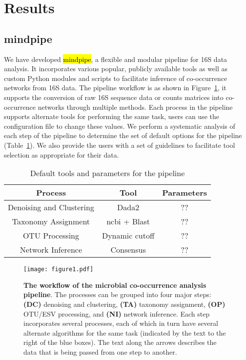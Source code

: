 
\section*{Results}

  \subsection*{mindpipe}

  We have developed \hl{mindpipe}, a flexible and modular pipeline for 16S data analysis.
  It incorporates various popular, publicly available tools as well as custom Python modules and scripts to facilitate inference of co-occurrence networks from 16S data.
  The pipeline workflow is as shown in Figure~\ref{fig:figure1}, it supports the conversion of raw 16S sequence data or counts matrices into co-occurrence networks through multiple methods.
  Each process in the pipeline supports alternate tools for performing the same task, users can use the configuration file to change these values.
  We perform a systematic analysis of each step of the pipeline to determine the set of default options for the pipeline (Table~\ref{tab:default_options}).
  We also provide the users with a set of guidelines to facilitate tool selection as appropriate for their data.

  \begin{table}[h]
    \centering
    \small
    \begin{tabular}{|c|c|c|}
      \hline
      \textbf{Process} & \textbf{Tool} & \textbf{Parameters} \\
      \hline
      Denoising and Clustering & Dada2 & ?? \\
      Taxonomy Assignment & \ac{ncbi} + Blast & ?? \\
      OTU Processing & Dynamic cutoff & ?? \\
      Network Inference & Consensus & ?? \\
      \hline
    \end{tabular}
    \caption{Default tools and parameters for the pipeline}
    \label{tab:default_options}
  \end{table}

  \begin{figure}[h]
    \centering
    \texttt{[image: figure1.pdf]}
    \caption{
      \textbf{The workflow of the microbial co-occurrence analysis pipeline}.
      The processes can be grouped into four major steps: \textbf{(DC)} denoising and clustering, \textbf{(TA)} taxonomy assignment, \textbf{(OP)} OTU/ESV processing, and \textbf{(NI)} network inference.
      Each step incorporates several processes, each of which in turn have several alternate algorithms for the same task (indicated by the text to the right of the blue boxes).
      The text along the arrows describes the data that is being passed from one step to another.
    }
    \label{fig:figure1}
  \end{figure}

